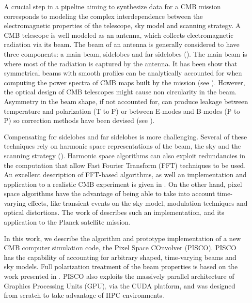 \documentclass[a4paper,fleqn]{cas-dc}\sloppy
\begin{document}
A crucial step in a pipeline aiming to synthesize data for a CMB mission corresponds to modeling the complex interdependence between the electromagnetic properties of the telescope, sky model and scanning strategy. A CMB telescope is well modeled as an antenna, which collects electromagnetic radiation via its beam. The beam of an antenna is generally considered to have three components: a main beam, sidelobes and far sidelobes (\cite{2008PhT....61g..53B}). The main beam is where most of the radiation is captured by the antenna. It has been show that symmetrical beams with smooth profiles can be analytically accounted for when computing the power spectra of CMB maps built by the mission (see \cite{2003ApJS..148...39P}). However, the optical design of CMB telescopes might cause non circularity in the beam. Asymmetry in the beam shape, if not accounted for, can produce leakage between temperature and polarization (T to P) or between E-modes and B-modes (P to P) so correction methods have been devised (see \cite{PhysRevD.77.083003, 2007MNRAS.376.1767O, 2015JCAP...03..048D}).

Compensating for sidelobes and far sidelobes is more challenging. Several of these techniques rely on harmonic space representations of the beam, the sky and the scanning strategy (\cite{2001PhRvD..63l3002W,2000PhRvD..62l3002C}). Harmonic space algorithms can also exploit redundancies in the computation that allow Fast Fourier Transform (FFT) techniques to be used. An excellent description of FFT-based algorithms, as well an implementation and application to a realistic CMB experiment is given in \cite{2018arXiv180905034D}. On the other hand, pixel space algorithms have the advantage of being able to take into account time-varying effects, like transient events on the sky model, modulation techniques and optical distortions. The work of \cite{2011ApJS..193....5M} describes such an implementation, and its application to the Planck satellite mission.

In this work, we describe the algorithm and prototype implementation of a new CMB computer simulation code, the Pixel Space COnvolver (PISCO). PISCO has the capability of accounting for arbitrary shaped, time-varying beams and sky models. Full polarization treatment of the beam properties is based on the work presented in \cite{2007MNRAS.376.1767O}. PISCO also exploits the massively parallel architecture of Graphics Processing Units (GPU), via the CUDA platform, and was designed from scratch to take advantage of HPC environments.
\end{document}
